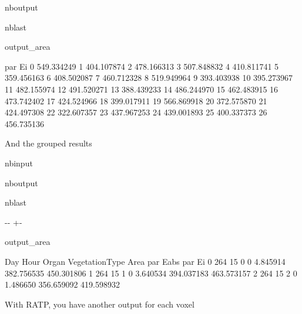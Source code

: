 \documentclass[letterpaper,10pt,english]{sphinxmanual}
\begin{document}
\begin{sphinxuseclass}{nboutput}
\begin{sphinxuseclass}{nblast}
{\begin{sphinxuseclass}{output_area}
\begin{sphinxuseclass}{}
\begin{sphinxVerbatim}[commandchars=\\\{\}]
        par Ei
0   549.334249
1   404.107874
2   478.166313
3   507.848832
4   410.811741
5   359.456163
6   408.502087
7   460.712328
8   519.949964
9   393.403938
10  395.273967
11  482.155974
12  491.520271
13  388.439233
14  486.244970
15  462.483915
16  473.742402
17  424.524966
18  399.017911
19  566.869918
20  372.575870
21  424.497308
22  322.607357
23  437.967253
24  439.001893
25  400.337373
26  456.735136
\end{sphinxVerbatim}



\end{sphinxuseclass}
\end{sphinxuseclass}
}

\end{sphinxuseclass}
\end{sphinxuseclass}
\sphinxAtStartPar
And the grouped results

\begin{sphinxuseclass}{nbinput}
{
\begin{sphinxVerbatim}[commandchars=\\\{\}]
\llap{\color{nbsphinxin}[8]:\,\hspace{\fboxrule}\hspace{\fboxsep}}
\end{sphinxVerbatim}
}

\end{sphinxuseclass}
\begin{sphinxuseclass}{nboutput}
\begin{sphinxuseclass}{nblast}
{

\kern-\sphinxverbatimsmallskipamount\kern-\baselineskip
\kern+\FrameHeightAdjust\kern-\fboxrule
\vspace{\nbsphinxcodecellspacing}

\begin{sphinxuseclass}{output_area}
\begin{sphinxuseclass}{}


\begin{sphinxVerbatim}[commandchars=\\\{\}]
   Day  Hour  Organ  VegetationType      Area    par Eabs      par Ei
0  264    15      0               0  4.845914  382.756535  450.301806
1  264    15      1               0  3.640534  394.037183  463.573157
2  264    15      2               0  1.486650  356.659092  419.598932
\end{sphinxVerbatim}



\end{sphinxuseclass}
\end{sphinxuseclass}
}

\end{sphinxuseclass}
\end{sphinxuseclass}
\sphinxAtStartPar
With RATP, you have another output for each voxel
\end{document}
